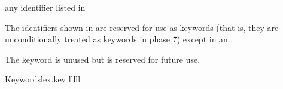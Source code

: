 \begin{bnf}
\br
    \textnormal{any identifier listed in }\br
    \br
    \br
\end{bnf}

\pnum
{}%
The identifiers shown in  are reserved for use
as keywords (that is, they are unconditionally treated as keywords in
phase 7) except in an .
\begin{note}
The  keyword is unused but
is reserved for future use.
\end{note}

\begin{multicolfloattable}{Keywords}{lex.key}
{lllll}
 \\
 \\
 \\
 \\
 \\
 \\
 \\
 \\
 \\
 \\
 \\
 \\
 \\
 \\
 \\
 \\
 \\
\columnbreak
{} \\
 \\
 \\
 \\
 \\
 \\
 \\
 \\
 \\
 \\
 \\
 \\

\end{multicolfloattable}
